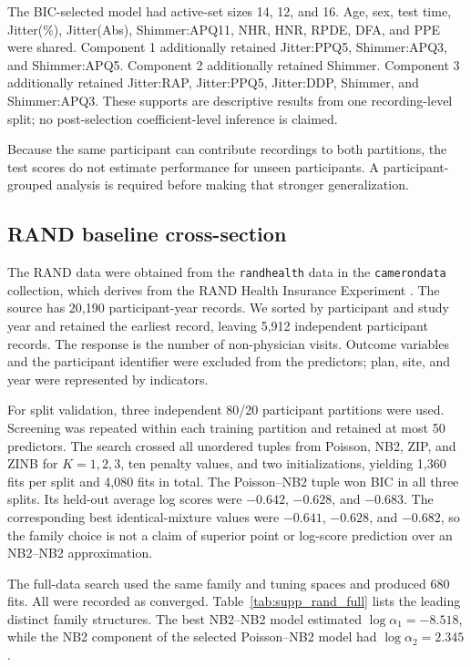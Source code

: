 \documentclass{article}
\begin{document}
The BIC-selected model had active-set sizes 14, 12, and 16.  Age, sex, test
time, Jitter(\%), Jitter(Abs), Shimmer:APQ11, NHR, HNR, RPDE, DFA, and PPE
were shared.  Component 1 additionally retained Jitter:PPQ5,
Shimmer:APQ3, and Shimmer:APQ5.  Component 2 additionally retained Shimmer.
Component 3 additionally retained Jitter:RAP, Jitter:PPQ5, Jitter:DDP,
Shimmer, and Shimmer:APQ3.  These supports are descriptive results from one
recording-level split; no post-selection coefficient-level inference is
claimed.

Because the same participant can contribute recordings to both partitions, the
test scores do not estimate performance for unseen participants.  A
participant-grouped analysis is required before making that stronger
generalization.

\subsection{RAND baseline cross-section}

The RAND data were obtained from the \texttt{randhealth} data in the
\texttt{camerondata} collection, which derives from the RAND Health Insurance
Experiment \citep{deb2002health,cameron2005microeconometrics}.  The source has
20,190 participant-year records.  We sorted by participant and study year and
retained the earliest record, leaving 5,912 independent participant records.
The response is the number of non-physician visits.  Outcome variables and the
participant identifier were excluded from the predictors; plan, site, and year
were represented by indicators.

For split validation, three independent 80/20 participant partitions were
used.  Screening was repeated within each training partition and retained at
most 50 predictors.  The search crossed all unordered tuples from Poisson,
NB2, ZIP, and ZINB for \(K=1,2,3\), ten penalty values, and two
initializations, yielding 1,360 fits per split and 4,080 fits in total.  The
Poisson--NB2 tuple won BIC in all three splits.  Its held-out average log scores
were \(-0.642\), \(-0.628\), and \(-0.683\).  The corresponding best
identical-mixture values were \(-0.641\), \(-0.628\), and \(-0.682\), so
the family choice is not a claim of superior point or log-score prediction over
an NB2--NB2 approximation.

The full-data search used the same family and tuning spaces and produced 680
fits.  All were recorded as converged.  Table~\ref{tab:supp_rand_full} lists
the leading distinct family structures.  The best NB2--NB2 model estimated
\(\log\alpha_1=-8.518\), while the NB2 component of the selected
Poisson--NB2 model had \(\log\alpha_2=2.345\).
\end{document}
